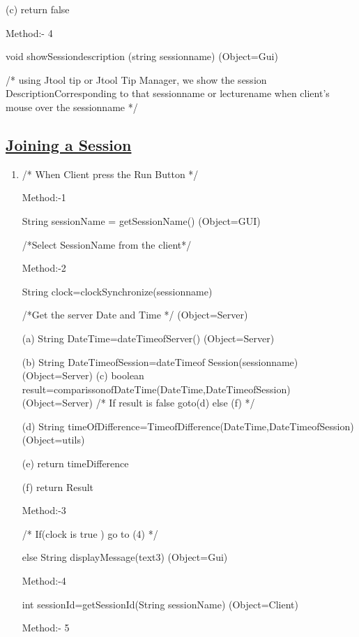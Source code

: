 \documentclass{article}
\begin{document}
\begin{enumerate}
\begin{enumerate}
(c) return false  
 
Method:- 4 

void showSessiondescription (string sessionname)    (Object=Gui)

/* using Jtool tip or Jtool Tip Manager, we show the session DescriptionCorresponding to that sessionname or lecturename when client's mouse over the sessionname */

\end{enumerate}
\subsection*{\underline{Joining a Session}}
\begin{enumerate}
\item[{}{}]

/* When Client press the Run Button */

\begin{enumerate}	 

Method:-1
 
String sessionName = getSessionName()  (Object=GUI)
 
     /*Select SessionName from the  client*/ 

Method:-2 

String clock=clockSynchronize(sessionname) 

     /*Get the server Date and Time */  (Object=Server) 

     (a) String DateTime=dateTimeofServer()         (Object=Server) 

     (b) String  DateTimeofSession=dateTimeof Session(sessionname)     (Object=Server) 
     (c) boolean   result=comparissonofDateTime(DateTime,DateTimeofSession)     (Object=Server) 
        /*  If result is false goto(d) else (f)  */ 

     (d) String timeOfDifference=TimeofDifference(DateTime,DateTimeofSession)    (Object=utils) 

     (e) return timeDifference 

     (f)  return Result 

Method:-3 

/* If(clock is true )  go to (4)   */ 

       else String displayMessage(text3)             (Object=Gui)     

Method:-4 

     int sessionId=getSessionId(String sessionName)   (Object=Client) 

Method:- 5 


\end{enumerate}
\end{enumerate}
\end{enumerate}
\end{document}
